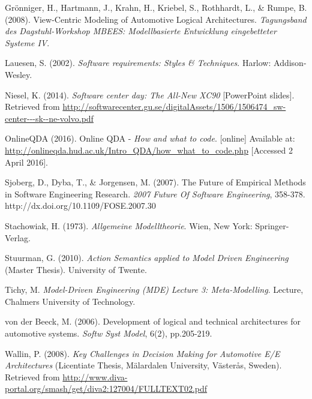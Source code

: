 \begin{thebibliography}{69}
Grönniger, H., Hartmann, J., Krahn, H., Kriebel, S., Rothhardt, L., \& Rumpe, B. (2008). View-Centric Modeling of Automotive Logical Architectures. \textit{Tagungsband des Dagstuhl-Workshop MBEES: Modellbasierte Entwicklung eingebetteter Systeme IV}.

Lauesen, S. (2002). \textit{Software requirements: Styles \& Techniques}. Harlow: Addison-Wesley.

Niesel, K. (2014). \textit{Software center day: The All-New XC90} [PowerPoint slides]. Retrieved from \url{http://softwarecenter.gu.se/digitalAssets/1506/1506474_sw-center---sk--ne-volvo.pdf}

OnlineQDA (2016). Online QDA - \textit{How and what to code}. [online] Available at: \url{http://onlineqda.hud.ac.uk/Intro_QDA/how_what_to_code.php} [Accessed 2 April 2016].

Sjoberg, D., Dyba, T., \& Jorgensen, M. (2007). The Future of Empirical Methods in Software Engineering Research. \textit{2007 Future Of Software Engineering}, 358-378. http://dx.doi.org/10.1109/FOSE.2007.30

Stachowiak, H. (1973). \textit{Allgemeine Modelltheorie}. Wien, New York: Springer-Verlag.

Stuurman, G. (2010). \textit{Action Semantics applied to Model Driven Engineering} (Master Thesis). University of Twente.

Tichy, M. \textit{Model-Driven Engineering (MDE) Lecture 3: Meta-Modelling}. Lecture, Chalmers University of Technology.

von der Beeck, M. (2006). Development of logical and technical architectures for automotive systems. \textit{Softw Syst Model}, 6(2), pp.205-219.

Wallin, P. (2008). \textit{Key Challenges in Decision Making for Automotive E/E Architectures} (Licentiate Thesis, Mälardalen University, Västerås, Sweden). Retrieved from \url{http://www.diva-portal.org/smash/get/diva2:127004/FULLTEXT02.pdf} 

\end{thebibliography}
